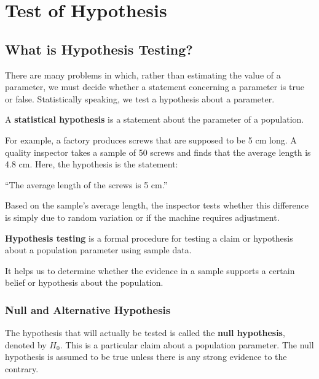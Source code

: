 \documentclass[twoside]{book}
\begin{document}
\chapter{Test of Hypothesis}
\section{What is Hypothesis Testing?}

There are many problems in which, rather than estimating the value of a parameter, we must decide whether a statement concerning a parameter is true or false. Statistically speaking, we test a hypothesis about a parameter.


\begin{textbox}
A \textbf{statistical hypothesis} is a statement about the parameter of a population.
\end{textbox}

For example, a factory produces screws that are supposed to be 5 cm long. A quality inspector takes a sample of 50 screws and finds that the average length is 4.8 cm. Here, the hypothesis is the statement:

\begin{center}
``{The average length of the screws is 5 cm.}''
\end{center}

Based on the sample's average length, the inspector tests whether this difference is simply due to random variation or if the machine requires adjustment.

\begin{textbox}
\textbf{Hypothesis testing} is a formal procedure for testing a claim or hypothesis about a population parameter using sample data.
\end{textbox}
It helps us to determine whether the evidence in a sample supports a certain belief or hypothesis about the population.

\subsection{Null and Alternative Hypothesis}

The hypothesis that will actually be tested is called the \textbf{null hypothesis}, denoted by $H_0$. This is a particular claim about a population parameter. The null hypothesis is assumed to be true unless there is any strong evidence to the contrary.
\end{document}
